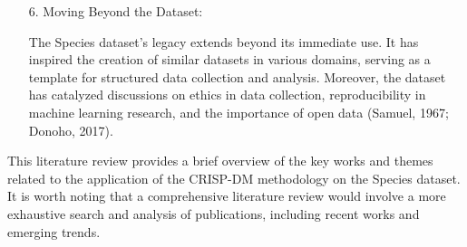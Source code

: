 \documentclass{article}
\begin{document}
\begin{itemize}
    \item[6.]Moving Beyond the Dataset:
    
The Species dataset's legacy extends beyond its immediate use. It has inspired the creation of similar datasets in various domains, serving as a template for structured data collection and analysis. Moreover, the dataset has catalyzed discussions on ethics in data collection, reproducibility in machine learning research, and the importance of open data (Samuel, 1967; Donoho, 2017).


\end{itemize}

This literature review provides a brief overview of the key works and themes related to the application of the CRISP-DM methodology on the Species dataset. It is worth noting that a comprehensive literature review would involve a more exhaustive search and analysis of publications, including recent works and emerging trends.
\end{document}
